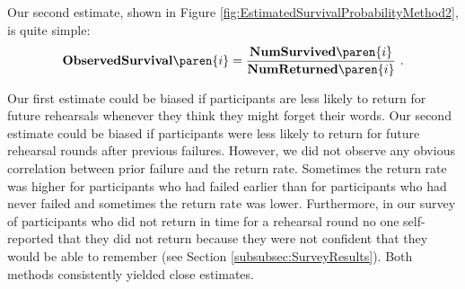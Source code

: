 Our second estimate, shown in Figure \ref{fig:EstimatedSurvivalProbabilityMethod2}, is quite simple: \[ \mathbf{ObservedSurvival}\paren{i} = \frac{\mathbf{NumSurvived}\paren{i}}{\mathbf{NumReturned}\paren{i}} \ . \] 

Our first estimate could be biased if participants are less likely to return for future rehearsals whenever they think they might forget their words. Our second estimate could be biased if participants were less likely to return for future rehearsal rounds after previous failures. However, we did not observe any obvious correlation between prior failure and the return rate. Sometimes the return rate was higher for participants who had failed earlier than for participants who had never failed and sometimes the return rate was lower. Furthermore, in our survey of participants who did not return in time for a rehearsal round no one self-reported that they did not return because they were not confident that they would be able to remember (see Section \ref{subsubsec:SurveyResults}). Both methods consistently yielded close estimates. 

